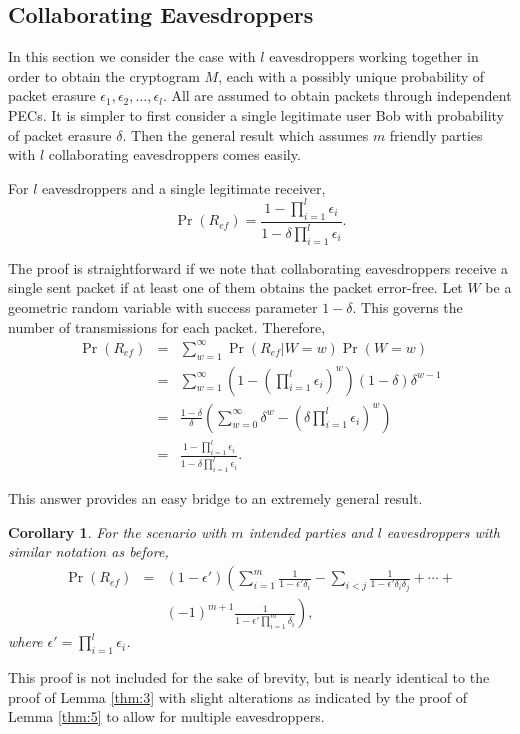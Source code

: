 \documentclass[10pt,twocolumn,twoside]{IEEEtran} \newlength{\pic}
\newtheorem{corollary}{Corollary}
\theoremstyle{definition}
\theoremstyle{remark}
\theoremstyle{plain}
\begin{document}
\subsection{Collaborating Eavesdroppers}
In this section we consider the case with $l$ eavesdroppers working together in order to obtain the cryptogram $M$, each with a possibly unique probability of packet erasure $\epsilon_1, \epsilon_2, \ldots, \epsilon_l$. All are assumed to obtain packets through independent PECs. It is simpler to first consider a single legitimate user Bob with probability of packet erasure $\delta$. Then the general result which assumes $m$ friendly parties with $l$ collaborating eavesdroppers comes easily.
\begin{lemma}\label{thm:5}
 For $l$ eavesdroppers and a single legitimate receiver,
 \begin{equation}
  \Pr(R_{ef}) = \frac{1 - \prod_{i=1}^l\epsilon_i}{1-\delta\prod_{i=1}^l\epsilon_i}.
 \end{equation}
\end{lemma}
\begin{IEEEproof}
 The proof is straightforward if we note that collaborating eavesdroppers receive a single sent packet if at least one of them obtains the packet error-free. Let $W$ be a geometric random variable with success parameter $1-\delta$. This governs the number of transmissions for each packet. Therefore,
 \begin{eqnarray}\label{eq:Ref1userLeaves}
  \Pr(R_{ef}) &=& \sum_{w=1}^\infty\Pr(R_{ef}|W=w)\Pr(W=w)\nonumber \\
  &=& \sum_{w=1}^\infty(1-(\prod_{i=1}^l\epsilon_i)^w)(1-\delta)\delta^{w-1} \nonumber \\
  &=&\frac{1-\delta}{\delta}\left(\sum_{w=0}^\infty\delta^w - (\delta\prod_{i=1}^l\epsilon_i)^w\right) \nonumber \\
  &=& \frac{1-\prod_{i=1}^l\epsilon_i}{1-\delta\prod_{i=1}^l\epsilon_i}.
 \end{eqnarray}
\end{IEEEproof}

This answer provides an easy bridge to an extremely general result.
\begin{corollary}\label{thm:6}
For the scenario with $m$ intended parties and $l$ eavesdroppers with similar notation as before,
 \begin{eqnarray}
  \Pr(R_{ef}) &=& (1-\epsilon')\left(\sum_{i=1}^m\frac{1}{1-\epsilon'\delta_i} - \sum_{i<j}\frac{1}{1-\epsilon'\delta_i\delta_j} + \cdots + \nonumber \right.\\ & & \left. (-1)^{m+1}\frac{1}{1-\epsilon'\prod_{i=1}^m\delta_i}\right),
 \end{eqnarray}
 where $\epsilon' = \prod_{i=1}^l\epsilon_i$.
\end{corollary}
\begin{IEEEproof}
 This proof is not included for the sake of brevity, but is nearly identical to the proof of Lemma \ref{thm:3} with slight alterations as indicated by the proof of Lemma \ref{thm:5} to allow for multiple eavesdroppers.
\end{IEEEproof}
\end{document}
